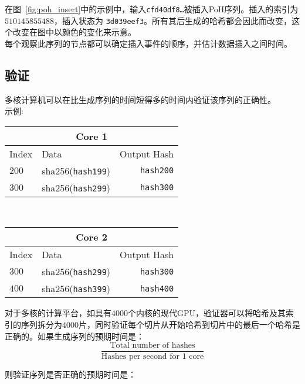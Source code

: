 \documentclass[12pt, uft8]{ctexart}
\begin{document}
  在图~\ref{fig:poh_insert}中的示例中，输入\texttt{cfd40df8\ldots}被插入PoH序列。插入的索引为 $510145855488$，插入状态为 \texttt{3d039eef3}。所有其后生成的哈希都会因此而改变，这个改变在图中以颜色的变化来示意。\\

每个观察此序列的节点都可以确定插入事件的顺序，并估计数据插入之间时间。

\subsection{验证}\label{poh:verify}
多核计算机可以在比生成序列的时间短得多的时间内验证该序列的正确性。\\

\noindent 示例: \\\noindent

\begin{center}

\begin{tabular}{l l r}
    \multicolumn{3}{c}{Core 1} \\ \hline
    Index & Data & Output Hash \\ \hline
    $200$ & sha256(\texttt{hash199}) & \texttt{hash200} \\
    $300$ & sha256(\texttt{hash299}) & \texttt{hash300}\\
    \end{tabular}\\

  \begin{tabular}{l l r}
    \multicolumn{3}{c}{Core 2} \\
    \hline
    Index & Data & Output Hash \\ \hline
    $300$ & sha256(\texttt{hash299}) & \texttt{hash300} \\
    $400$ & sha256(\texttt{hash399}) & \texttt{hash400}\\
    \end{tabular}

\end{center}


对于多核的计算平台，如具有$4000$个内核的现代GPU，验证器可以将哈希及其索引的序列拆分为$4000$片，同时验证每个切片从开始哈希到切片中的最后一个哈希是正确的。如果生成序列的预期时间是：\\


\[
\frac{\textrm{Total number of hashes}}{\textrm{Hashes per second for 1 core}}
\]

\noindent 则验证序列是否正确的预期时间是：\\
\end{document}
